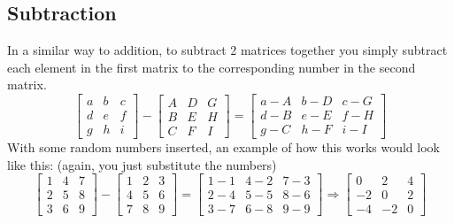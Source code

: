 \documentclass{article}
\begin{document}
\subsection{Subtraction}
In a similar way to addition, to subtract 2 matrices together you simply subtract each element in the first matrix to the corresponding number in the second matrix.
\begin{equation*}
	\begin{bmatrix}
		a & b & c\\
		d & e & f\\
		g & h & i
	\end{bmatrix}
	-
	\begin{bmatrix}
		A & D & G\\
		B & E & H\\
		C & F & I
	\end{bmatrix}
	=
	\begin{bmatrix}
		a-A & b-D & c-G\\
		d-B & e-E & f-H\\
		g-C & h-F & i-I
	\end{bmatrix}
\end{equation*}
With some random numbers inserted, an example of how this works would look like this: (again, you just substitute the numbers)
\begin{equation*}
	\begin{bmatrix}
		1 & 4 & 7\\
		2 & 5 & 8\\
		3 & 6 & 9
	\end{bmatrix}
	-
	\begin{bmatrix}
		1 & 2 & 3\\
		4 & 5 & 6\\
		7 & 8 & 9
	\end{bmatrix}
	=
	\begin{bmatrix}
		1-1 & 4-2 & 7-3\\
		2-4 & 5-5 & 8-6\\
		3-7 & 6-8 & 9-9
	\end{bmatrix}
	\Rightarrow
	\begin{bmatrix}
		0 & 2 & 4\\
		-2 & 0 & 2\\
		-4 & -2 & 0
	\end{bmatrix}
\end{equation*}
\end{document}
